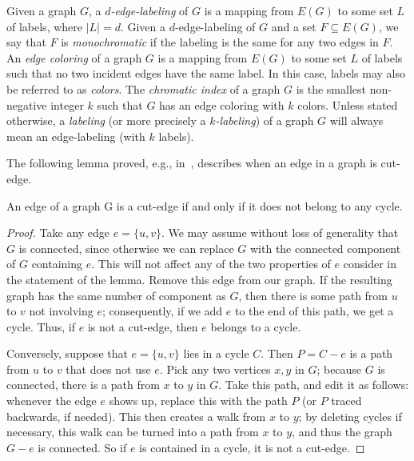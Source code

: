 \documentclass[12pt,a4paper,titlepage,openany]{report}
\begin{document}
Given a graph $G$, a \emph{$d$-edge-labeling} of $G$ is a mapping from $E(G)$ to some set $L$ of labels, where $|L| = d$. Given a $d$-edge-labeling of $G$ and a set $F \subseteq E(G)$, we say that $F$ is \emph{monochromatic} if the labeling is the same for any two edges in $F$. An \emph{edge coloring} of a graph $G$ is a mapping from $E(G)$ to some set $L$ of labels such that no two incident edges have the same label. In this case, labels may also be referred to as \emph{colors}. The \emph{chromatic index} of a graph $G$ is the smallest non-negative integer $k$ such that $G$ has an edge coloring with $k$ colors. Unless stated otherwise, a \emph{labeling} (or more precisely a \emph{$k$-labeling}) of a graph $G$ will always mean an edge-labeling (with $k$ labels).

The following lemma proved, e.g., in~\cite{Douglas}, describes when an edge in a graph is cut-edge.

\begin{lemma}\label{cutedgecycle}
An edge of a graph G is a cut-edge if and only if it does not belong to any cycle.
\end{lemma}

\begin{proof} Take any edge $e = \{u, v\}$. We may assume without loss of generality that $G$ is connected, since otherwise we can replace $G$ with the connected component of $G$ containing $e$. This will not affect any of the two properties of $e$ consider in the statement of the lemma.  Remove this edge from our graph. If the resulting graph has the same number of component as $G$, then there is some path from $u$ to $v$ not involving $e$;
consequently, if we add $e$ to the end of this path, we get a cycle. Thus, if $e$ is not a cut-edge, then $e$ belongs to a cycle.

Conversely, suppose that $e = \{u, v\}$ lies in a cycle $C$. Then $P=C-e$ is a path from $u$ to $v$ that does not use $e$. Pick any two vertices $x, y$ in $G$; because $G$ is connected, there is a path from $x$ to $y$ in $G$. Take this path, and edit it as follows:
whenever the edge $e$ shows up, replace this with the path $P$ (or $P$ traced backwards, if needed). This then creates a walk from $x$ to $y$; by deleting cycles if necessary, this walk can be turned into a path from $x$ to $y$, and thus the graph $G-e$ is connected. So if $e$ is contained in a cycle, it is not a cut-edge.
\end{proof}
\end{document}
